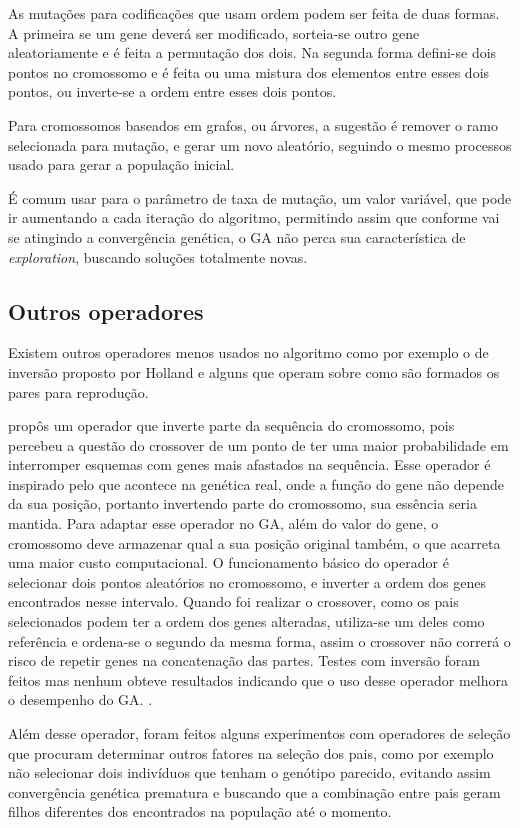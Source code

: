 As mutações para codificações que usam ordem podem ser feita de duas formas. A primeira se um gene deverá ser modificado, sorteia-se outro gene aleatoriamente e é feita a permutação dos dois. Na segunda forma defini-se dois pontos no cromossomo e é feita ou uma mistura dos elementos entre esses dois pontos, ou inverte-se a ordem entre esses dois pontos.

Para cromossomos baseados em grafos, ou árvores, a sugestão é remover o ramo selecionada para mutação, e gerar um novo aleatório, seguindo o mesmo processos usado para gerar a população inicial.

É comum usar para o parâmetro de taxa de mutação, um valor variável, que pode ir aumentando a cada iteração do algoritmo, permitindo assim que conforme vai se atingindo a convergência genética, o GA não perca sua característica de \textit{exploration}, buscando soluções totalmente novas.

\subsection{Outros operadores}
Existem outros operadores menos usados no algoritmo como por exemplo o de inversão proposto por Holland e alguns que operam sobre como são formados os pares para reprodução.

\citeauthor{Holland1992} propôs um operador que inverte parte da sequência do cromossomo, pois percebeu a questão do crossover de um ponto de ter uma maior probabilidade em interromper esquemas com genes mais afastados na sequência. Esse operador é inspirado pelo que acontece na genética real, onde a função do gene não depende da sua posição, portanto invertendo parte do cromossomo, sua essência seria mantida. Para adaptar esse operador no GA, além do valor do gene, o cromossomo deve armazenar qual a sua posição original também, o que acarreta uma maior custo computacional. O funcionamento básico do operador é selecionar dois pontos aleatórios no cromossomo, e inverter a ordem dos genes encontrados nesse intervalo. Quando foi realizar o crossover, como os pais selecionados podem ter a ordem dos genes alteradas, utiliza-se um deles como referência e ordena-se o segundo da mesma forma, assim o crossover não correrá o risco de repetir genes na concatenação das partes. Testes com inversão foram feitos mas nenhum obteve resultados indicando que o uso desse operador melhora o desempenho do GA. \cite{Mitchell1996}.

Além desse operador, foram feitos alguns experimentos com operadores de seleção que procuram determinar outros fatores na seleção dos pais, como por exemplo não selecionar dois indivíduos que tenham o genótipo parecido, evitando assim convergência genética prematura e buscando que a combinação entre pais geram filhos diferentes dos encontrados na população até o momento.

